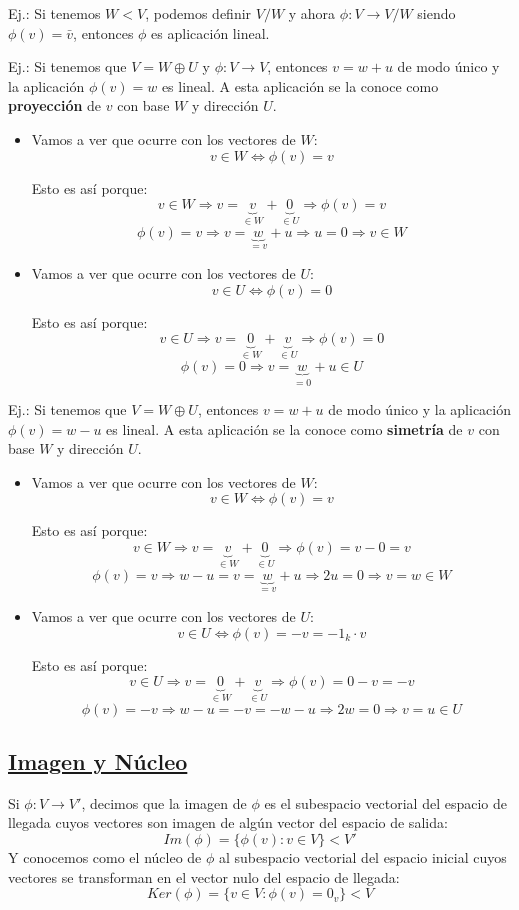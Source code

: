 \documentclass[10pt,a4paper,openright]{book}
\begin{document}
Ej.: Si tenemos $W<V$, podemos definir $V/W$ y ahora $\phi: V\longrightarrow V/W$ siendo $\phi(v)=\bar{v}$, entonces $\phi$ es aplicación lineal.

Ej.: Si tenemos que $V=W\oplus U$ y $\phi: V\longrightarrow V$, entonces $v=w+u$ de modo único y la aplicación $\phi(v)=w$ es lineal. A esta aplicación se la conoce como \textbf{proyección} de $v$ con base $W$ y dirección $U$.
\begin{itemize}
\item Vamos a ver que ocurre con los vectores de $W$:
$$v\in W\Leftrightarrow \phi(v)=v$$

Esto es así porque:
$$v\in W\Rightarrow v=\underbrace{v}_{\in W}+\underbrace{0}_{\in U}\Rightarrow \phi(v)=v$$
$$\phi(v)=v\Rightarrow v=\underbrace{w}_{=v}+u\Rightarrow u=0\Rightarrow v\in W$$

\item Vamos a ver que ocurre con los vectores de $U$:
$$v\in U\Leftrightarrow \phi(v)=0$$

Esto es así porque:
$$v\in U\Rightarrow v=\underbrace{0}_{\in W}+\underbrace{v}_{\in U}\Rightarrow \phi(v)=0$$
$$\phi(v)=0\Rightarrow v=\underbrace{w}_{=0}+u\in U$$
\end{itemize}

Ej.: Si tenemos que $V=W\oplus U$, entonces $v=w+u$ de modo único y la aplicación $\phi(v)=w-u$ es lineal. A esta aplicación se la conoce como \textbf{simetría} de $v$ con base $W$ y dirección $U$.
\begin{itemize}
\item Vamos a ver que ocurre con los vectores de $W$:
$$v\in W\Leftrightarrow \phi(v)=v$$

Esto es así porque:
$$v\in W\Rightarrow v=\underbrace{v}_{\in W}+\underbrace{0}_{\in U}\Rightarrow \phi(v)=v-0=v$$
$$\phi(v)=v\Rightarrow w-u=v=\underbrace{w}_{=v}+u\Rightarrow 2u=0\Rightarrow v=w\in W$$

\item Vamos a ver que ocurre con los vectores de $U$:
$$v\in U\Leftrightarrow \phi(v)=-v=-1_k\cdot v$$

Esto es así porque:
$$v\in U\Rightarrow v=\underbrace{0}_{\in W}+\underbrace{v}_{\in U}\Rightarrow \phi(v)=0-v=-v$$
$$\phi(v)=-v\Rightarrow w-u=-v=-w-u\Rightarrow 2w=0\Rightarrow v=u\in U$$
\end{itemize}

\subsection*{\underline{Imagen y Núcleo}}
Si $\phi: V\longrightarrow V'$, decimos que la imagen de $\phi$ es el subespacio vectorial del espacio de llegada cuyos vectores son imagen de algún vector del espacio de salida:
$$Im(\phi)=\{\phi(v): v\in V\}<V'$$
Y conocemos como el núcleo de $\phi$ al subespacio vectorial del espacio inicial cuyos vectores se transforman en el vector nulo del espacio de llegada:
$$Ker(\phi)=\{v\in V: \phi(v)=0_v\}<V$$
\end{document}
